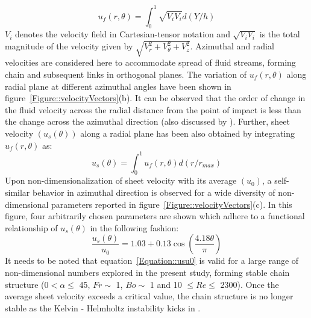 \documentclass[%
 aip,
 sd,%
amsmath,amssymb,
preprint,%
author-year,%
]{revtex4-1}
\begin{document}
\begin{equation}\label{Equation::uf}
u_f(r,\theta) = \int_{0}^{1}\sqrt{V_iV_i}d(Y/h)
\end{equation}
$V_i$ denotes the velocity field in Cartesian-tensor notation and $\sqrt{V_iV_i}$ is the total magnitude of the velocity given by $\sqrt{V_r^2 + V_\theta^2 + V_z^2}$. Azimuthal and radial velocities are considered here to accommodate spread of fluid streams, forming chain and subsequent links in orthogonal planes. The variation of $u_f(r,\theta)$ along radial plane at different azimuthal angles have been shown in figure~\ref{Figure::velocityVectors}(b). It can be observed that the order of change in the fluid velocity across the radial distance from the point of impact is less than the change across the azimuthal direction (also discussed by \cite{choo2002velocity}). Further, sheet velocity $\left(u_s(\theta)\right)$ along a radial plane has been also obtained by integrating $u_f(r,\theta)$ as:
\begin{equation}\label{Equation::us}
u_s(\theta) = \int_{0}^{1}u_f(r,\theta)d(r/r_{max})
\end{equation} 
Upon non-dimensionalization of sheet velocity with its average $\left(u_0\right)$, a self-similar behavior in azimuthal direction is observed for a wide diversity of non-dimensional parameters reported in figure~\ref{Figure::velocityVectors}(c). In this figure, four arbitrarily chosen parameters are shown which adhere to a functional relationship of $u_s(\theta)$ in the following fashion: 
\begin{equation}\label{Equation::usu0}
\frac{u_s(\theta)}{u_0} = 1.03 + 0.13\cos\left(\frac{4.18\theta}{\pi}\right)
\end{equation}
It needs to be noted that equation~\ref{Equation::usu0} is valid for a large range of non-dimensional numbers explored in the present study, forming stable chain structure (0\degree $< \alpha \le$  45\degree, $Fr \sim$ 1, $Bo \sim$ 1 and 10 $\le Re \le$ 2300). Once the average sheet velocity exceeds a critical value, the chain structure is no longer stable as the  Kelvin - Helmholtz instability kicks in \citep{villermaux2002life}. \\
\end{document}
